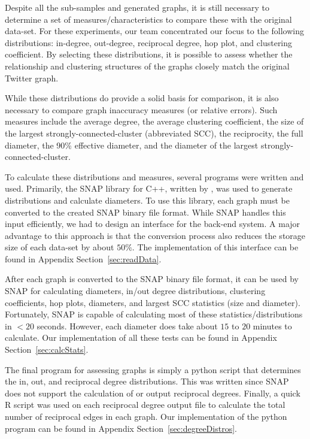 \documentclass[pdftex,11pt,a4paper,twocolumn]{scrartcl}
\begin{document}
Despite all the sub-samples and generated graphs, it is still necessary to determine a set of measures/characteristics to compare these with the original data-set. For these experiments, our team concentrated our focus to the following distributions: in-degree, out-degree, reciprocal degree, hop plot, and clustering coefficient. By selecting these distributions, it is possible to assess whether the relationship and clustering structures of the graphs closely match the original Twitter graph. 

While these distributions do provide a solid basis for comparison, it is also necessary to compare graph inaccuracy measures (or relative errors). Such measures include the average degree, the average clustering coefficient, the size of the largest strongly-connected-cluster (abbreviated SCC), the reciprocity, the full diameter, the 90\% effective diameter, and the diameter of the largest strongly-connected-cluster. 

To calculate these distributions and measures, several programs were written and used. Primarily, the SNAP library for C++, written by \cite{snap}, was used to generate distributions and calculate diameters. To use this library, each graph must be converted to the created SNAP binary file format. While SNAP handles this input efficiently, we had to design an interface for the back-end system. A major advantage to this approach is that the conversion process also reduces the storage size of each data-set by about $50\%$. The implementation of this interface can be found in Appendix Section~\ref{sec:readData}. 

After each graph is converted to the SNAP binary file format, it can be used by SNAP for calculating diameters, in/out degree distributions, clustering coefficients, hop plots, diameters, and largest SCC statistics (size and diameter). Fortunately, SNAP is capable of calculating most of these statistics/distributions in $<20$ seconds. However, each diameter does take about $15$ to $20$ minutes to calculate. Our implementation of all these tests can be found in Appendix Section~\ref{sec:calcStats}.

The final program for assessing graphs is simply a python script that determines the in, out, and reciprocal degree distributions. This was written since SNAP does not support the calculation of or output reciprocal degrees. Finally, a quick R script was used on each reciprocal degree output file to calculate the total number of reciprocal edges in each graph. Our implementation of the python program can be found in Appendix Section~\ref{sec:degreeDistros}.
\end{document}
